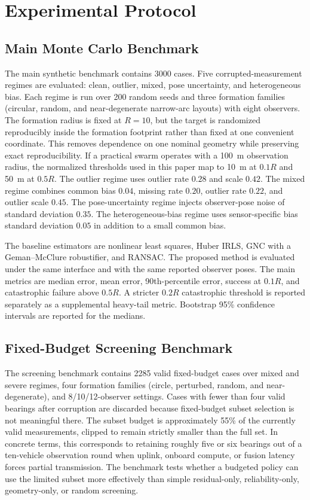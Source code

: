 \documentclass[drones,article,submit,pdftex,moreauthors]{Definitions/mdpi}
\begin{document}
\section{Experimental Protocol}

\subsection{Main Monte Carlo Benchmark}

The main synthetic benchmark contains 3000 cases. Five corrupted-measurement regimes are evaluated: clean, outlier, mixed, pose uncertainty, and heterogeneous bias. Each regime is run over 200 random seeds and three formation families (circular, random, and near-degenerate narrow-arc layouts) with eight observers. The formation radius is fixed at $R=10$, but the target is randomized reproducibly inside the formation footprint rather than fixed at one convenient coordinate. This removes dependence on one nominal geometry while preserving exact reproducibility. If a practical swarm operates with a 100~m observation radius, the normalized thresholds used in this paper map to 10~m at $0.1R$ and 50~m at $0.5R$. The outlier regime uses outlier rate $0.28$ and scale $0.42$. The mixed regime combines common bias $0.04$, missing rate $0.20$, outlier rate $0.22$, and outlier scale $0.45$. The pose-uncertainty regime injects observer-pose noise of standard deviation $0.35$. The heterogeneous-bias regime uses sensor-specific bias standard deviation $0.05$ in addition to a small common bias.

The baseline estimators are nonlinear least squares, Huber IRLS, GNC with a Geman--McClure robustifier, and RANSAC. The proposed method is evaluated under the same interface and with the same reported observer poses. The main metrics are median error, mean error, 90th-percentile error, success at $0.1R$, and catastrophic failure above $0.5R$. A stricter $0.2R$ catastrophic threshold is reported separately as a supplemental heavy-tail metric. Bootstrap 95\% confidence intervals are reported for the medians.

\subsection{Fixed-Budget Screening Benchmark}

The screening benchmark contains 2285 valid fixed-budget cases over mixed and severe regimes, four formation families (circle, perturbed, random, and near-degenerate), and 8/10/12-observer settings. Cases with fewer than four valid bearings after corruption are discarded because fixed-budget subset selection is not meaningful there. The subset budget is approximately 55\% of the currently valid measurements, clipped to remain strictly smaller than the full set. In concrete terms, this corresponds to retaining roughly five or six bearings out of a ten-vehicle observation round when uplink, onboard compute, or fusion latency forces partial transmission. The benchmark tests whether a budgeted policy can use the limited subset more effectively than simple residual-only, reliability-only, geometry-only, or random screening.
\end{document}
